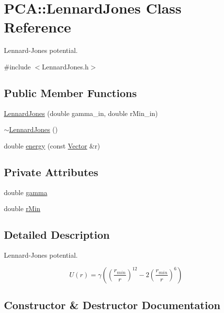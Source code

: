\hypertarget{class_p_c_a_1_1_lennard_jones}{}\section{P\+CA\+:\+:Lennard\+Jones Class Reference}
\label{class_p_c_a_1_1_lennard_jones}


Lennard-\/\+Jones potential.  




{\ttfamily \#include $<$Lennard\+Jones.\+h$>$}

\subsection*{Public Member Functions}
\begin{DoxyCompactItemize}
\item 
\hyperlink{class_p_c_a_1_1_lennard_jones_a177de9041d696f41ac2b498973047759}{Lennard\+Jones} (double gamma\+\_\+in, double r\+Min\+\_\+in)
\item 
\hyperlink{class_p_c_a_1_1_lennard_jones_ac8acfe0ebd2e7f263d6561ab515f0028}{$\sim$\+Lennard\+Jones} ()
\item 
double \hyperlink{class_p_c_a_1_1_lennard_jones_aa3ccc6cb511c3a10b1982c965a69e5be}{energy} (const \hyperlink{class_p_c_a_1_1_vector}{Vector} \&r)
\end{DoxyCompactItemize}
\subsection*{Private Attributes}
\begin{DoxyCompactItemize}
\item 
double \hyperlink{class_p_c_a_1_1_lennard_jones_ad28ea138038c2c43e9fd000752ea6130}{gamma}
\item 
double \hyperlink{class_p_c_a_1_1_lennard_jones_aa59f5f2bb7cf5c83a33a7f95d23ef4c8}{r\+Min}
\end{DoxyCompactItemize}


\subsection{Detailed Description}
Lennard-\/\+Jones potential. 

\[ U(r)= \gamma \left( \left(\frac{r_{min}}{r}\right)^{12} - 2 \left(\frac{r_{min}}{r}\right)^6\right)\] 

\subsection{Constructor \& Destructor Documentation}
\hypertarget{class_p_c_a_1_1_lennard_jones_a177de9041d696f41ac2b498973047759}{}\label{class_p_c_a_1_1_lennard_jones_a177de9041d696f41ac2b498973047759} 

